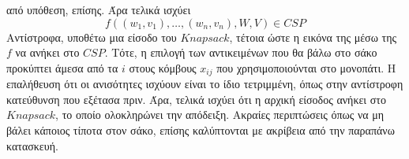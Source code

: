 \documentclass[12pt]{article}
\begin{document}
από υπόθεση, επίσης. Άρα τελικά ισχύει
$$f((w_1,v_1),\ldots,(w_n,v_n),W,V)\in CSP$$
Αντίστροφα, υποθέτω μια είσοδο του $Knapsack$, τέτοια ώστε η εικόνα της μέσω της $f$ να ανήκει στο $CSP$. Τότε, η επιλογή των αντικειμένων που θα βάλω στο σάκο προκύπτει άμεσα από τα $i$ στους κόμβους $x_{ij}$ που χρησιμοποιούνται στο μονοπάτι. Η επαλήθευση ότι οι ανισότητες ισχύουν είναι το ίδιο τετριμμένη, όπως στην αντίστροφη κατεύθυνση που εξέτασα πριν. Άρα, τελικά ισχύει ότι η αρχική είσοδος ανήκει στο $Knapsack$, το οποίο ολοκληρώνει την απόδειξη. Ακραίες περιπτώσεις όπως να μη βάλει κάποιος τίποτα στον σάκο, επίσης καλύπτονται με ακρίβεια από την παραπάνω κατασκευή.
\end{document}
